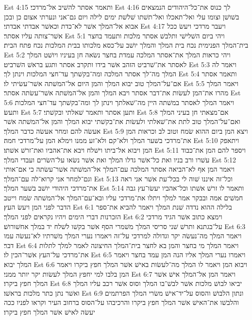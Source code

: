 Est 4:15  ותאמר אסתר להשׁיב אל־מרדכי׃
Est 4:16  לך כנוס את־כל־היהודים הנמצאים בשׁושׁן וצומו עלי ואל־תאכלו ואל־תשׁתו שׁלשׁת ימים לילה ויום גם־אני ונערתי אצום כן ובכן אבוא אל־המלך אשׁר לא־כדת וכאשׁר אבדתי אבדתי׃
Est 4:17  ויעבר מרדכי ויעשׂ ככל אשׁר־צותה עליו אסתר׃
Est 5:1  ויהי ביום השׁלישׁי ותלבשׁ אסתר מלכות ותעמד בחצר בית־המלך הפנימית נכח בית המלך והמלך יושׁב על־כסא מלכותו בבית המלכות נכח פתח הבית׃
Est 5:2  ויהי כראות המלך את־אסתר המלכה עמדת בחצר נשׂאה חן בעיניו ויושׁט המלך לאסתר את־שׁרביט הזהב אשׁר בידו ותקרב אסתר ותגע בראשׁ השׁרביט׃
Est 5:3  ויאמר לה המלך מה־לך אסתר המלכה ומה־בקשׁתך עד־חצי המלכות וינתן לך׃
Est 5:4  ותאמר אסתר אם־על־המלך טוב יבוא המלך והמן היום אל־המשׁתה אשׁר־עשׂיתי לו׃
Est 5:5  ויאמר המלך מהרו את־המן לעשׂות את־דבר אסתר ויבא המלך והמן אל־המשׁתה אשׁר־עשׂתה אסתר׃
Est 5:6  ויאמר המלך לאסתר במשׁתה היין מה־שׁאלתך וינתן לך ומה־בקשׁתך עד־חצי המלכות ותעשׂ׃
Est 5:7  ותען אסתר ותאמר שׁאלתי ובקשׁתי׃
Est 5:8  אם־מצאתי חן בעיני המלך ואם־על־המלך טוב לתת את־שׁאלתי ולעשׂות את־בקשׁתי יבוא המלך והמן אל־המשׁתה אשׁר אעשׂה להם ומחר אעשׂה כדבר המלך׃
Est 5:9  ויצא המן ביום ההוא שׂמח וטוב לב וכראות המן את־מרדכי בשׁער המלך ולא־קם ולא־זע ממנו וימלא המן על־מרדכי חמה׃
Est 5:10  ויתאפק המן ויבוא אל־ביתו וישׁלח ויבא את־אהביו ואת־זרשׁ אשׁתו׃
Est 5:11  ויספר להם המן את־כבוד עשׁרו ורב בניו ואת כל־אשׁר גדלו המלך ואת אשׁר נשׂאו על־השׂרים ועבדי המלך׃
Est 5:12  ויאמר המן אף לא־הביאה אסתר המלכה עם־המלך אל־המשׁתה אשׁר־עשׂתה כי אם־אותי וגם־למחר אני קרוא־לה עם־המלך׃
Est 5:13  וכל־זה איננו שׁוה לי בכל־עת אשׁר אני ראה את־מרדכי היהודי יושׁב בשׁער המלך׃
Est 5:14  ותאמר לו זרשׁ אשׁתו וכל־אהביו יעשׂו־עץ גבה חמשׁים אמה ובבקר אמר למלך ויתלו את־מרדכי עליו ובא־עם־המלך אל־המשׁתה שׂמח וייטב הדבר לפני המן ויעשׂ העץ׃
Est 6:1  בלילה ההוא נדדה שׁנת המלך ויאמר להביא את־ספר הזכרנות דברי הימים ויהיו נקראים לפני המלך׃
Est 6:2  וימצא כתוב אשׁר הגיד מרדכי על־בגתנא ותרשׁ שׁני סריסי המלך משׁמרי הסף אשׁר בקשׁו לשׁלח יד במלך אחשׁורושׁ׃
Est 6:3  ויאמר המלך מה־נעשׂה יקר וגדולה למרדכי על־זה ויאמרו נערי המלך משׁרתיו לא־נעשׂה עמו דבר׃
Est 6:4  ויאמר המלך מי בחצר והמן בא לחצר בית־המלך החיצונה לאמר למלך לתלות את־מרדכי על־העץ אשׁר־הכין לו׃
Est 6:5  ויאמרו נערי המלך אליו הנה המן עמד בחצר ויאמר המלך יבוא׃
Est 6:6  ויבוא המן ויאמר לו המלך מה־לעשׂות באישׁ אשׁר המלך חפץ ביקרו ויאמר המן בלבו למי יחפץ המלך לעשׂות יקר יותר ממני׃
Est 6:7  ויאמר המן אל־המלך אישׁ אשׁר המלך חפץ ביקרו׃
Est 6:8  יביאו לבושׁ מלכות אשׁר לבשׁ־בו המלך וסוס אשׁר רכב עליו המלך ואשׁר נתן כתר מלכות בראשׁו׃
Est 6:9  ונתון הלבושׁ והסוס על־יד־אישׁ משׂרי המלך הפרתמים והלבשׁו את־האישׁ אשׁר המלך חפץ ביקרו והרכיבהו על־הסוס ברחוב העיר וקראו לפניו ככה יעשׂה לאישׁ אשׁר המלך חפץ ביקרו׃
